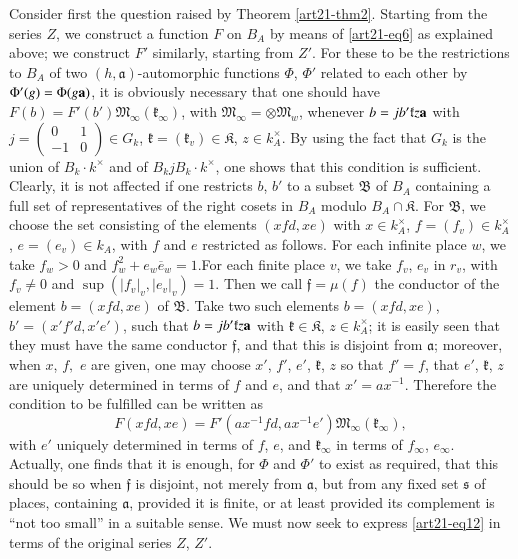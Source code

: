 Consider first the question raised by Theorem \ref{art21-thm2}. Starting from the series $Z$, we construct a function $F$ on $B_{A}$ by means of \eqref{art21-eq6} as explained above; we construct $F'$ similarly, starting from $Z'$. For these to be the restrictions to $B_{A}$ of two $(h,\mathfrak{a})$-automorphic functions $\Phi$, $\Phi'$ related to each other by $\Phi'(g)=\Phi(g\mathbf{a})$, it is obviously necessary that one should have $F(b)=F'(b')\mathfrak{M}_{\infty}(\mathfrak{k}_{\infty})$, with $\mathfrak{M}_{\infty}=\otimes \mathfrak{M}_{w}$, whenever $b=jb'\mathfrak{k}z\mathbf{a}$ with $j=\left(\begin{smallmatrix} 0 & 1\\ -1 & 0\end{smallmatrix}\right)\in G_{k}$, $\mathfrak{k}=(\mathfrak{k}_{v})\in \mathfrak{K}$, $z\in k^{\times}_{A}$. By using the fact that $G_{k}$ is the union of $B_{k}\cdot k^{\times}$ and of $B_{k}jB_{k}\cdot k^{\times}$, one shows that this condition is sufficient. Clearly, it is not affected if one restricts $b$, $b'$ to a subset $\mathfrak{B}$ of $B_{A}$ containing a full set of representatives of the right cosets in $B_{A}$ modulo $B_{A}\cap \mathfrak{K}$. For $\mathfrak{B}$, we choose the set consisting of the elements $(xfd,xe)$ with $x\in k^{\times}_{A}$, $f=(f_{v})\in k^{\times}_{A}$, $e=(e_{v})\in k_{A}$, with $f$ and $e$ restricted as follows. For each infinite place $w$, we take $f_{w}>0$ and $f^{2}_{w}+e_{w}\overline{e}_{w}=1$.\pageoriginale For each finite place $v$, we take $f_{v}$, $e_{v}$ in $r_{v}$, with $f_{v}\neq 0$ and $\sup (|f_{v}|_{v},|e_{v}|_{v})=1$. Then we call $\mathfrak{f}=\mu(f)$ the conductor of the element $b=(xfd,xe)$ of $\mathfrak{B}$. Take two such elements $b=(xfd,xe)$, $b'=(x'f'd,x'e')$, such that $b=jb'\mathfrak{k}z\mathbf{a}$ with $\mathfrak{k}\in \mathfrak{K}$, $z\in k^{\times}_{A}$; it is easily seen that they must have the same conductor $\mathfrak{f}$, and that this is disjoint from $\mathfrak{a}$; moreover, when $x$, $f,$ $e$ are given, one may choose $x'$, $f'$, $e'$, $\mathfrak{k}$, $z$ so that $f'=f$, that $e'$, $\mathfrak{k}$, $z$ are uniquely determined in terms of $f$ and $e$, and that $x'=ax^{-1}$. Therefore the condition to be fulfilled can be written as
\begin{equation*}
F(xfd,xe)=F'(ax^{-1}fd, ax^{-1}e')\mathfrak{M}_{\infty}(\mathfrak{k}_{\infty}),\tag{12}\label{art21-eq12}
\end{equation*}
with $e'$ uniquely determined in terms of $f$, $e$, and $\mathfrak{k}_{\infty}$ in terms of $f_{\infty}$, $e_{\infty}$. Actually, one finds that it is enough, for $\Phi$ and $\Phi'$ to exist as required, that this should be so when $\mathfrak{f}$ is disjoint, not merely from $\mathfrak{a}$, but from any fixed set $\mathfrak{s}$ of places, containing $\mathfrak{a}$, provided it is finite, or at least provided its complement is ``not too small'' in a suitable sense. We must now seek to express \eqref{art21-eq12} in terms of the original series $Z$, $Z'$.


